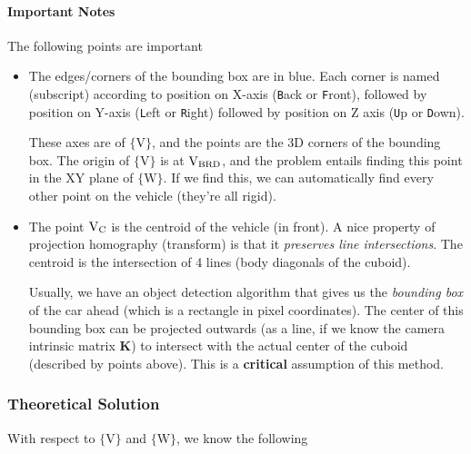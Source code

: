 \paragraph*{Important Notes}

The following points are important

\begin{itemize}
    \item The edges/corners of the bounding box are in blue. Each corner is named (subscript) according to position on X-axis (\texttt{B}ack or \texttt{F}ront), followed by position on Y-axis (\texttt{L}eft or \texttt{R}ight) followed by position on Z axis (\texttt{U}p or \texttt{D}own).

    These axes are of $\{\textrm{V}\}$, and the points are the 3D corners of the bounding box. The origin of $\{\textrm{V}\}$ is at $\textup{V}_{\textup{BRD}}$, and the problem entails finding this point in the XY plane of $\{\textrm{W}\}$. If we find this, we can automatically find every other point on the vehicle (they're all rigid).

    \item The point $\textup{V}_{\textup{C}}$ is the centroid of the vehicle (in front). A nice property of projection homography (transform) is that it \emph{preserves line intersections}. The centroid is the intersection of 4 lines (body diagonals of the cuboid).
    
    Usually, we have an object detection algorithm that gives us the \emph{bounding box} of the car ahead (which is a rectangle in pixel coordinates). The center of this bounding box can be projected outwards (as a line, if we know the camera intrinsic matrix $\mathbf{K}$) to intersect with the actual center of the cuboid (described by points above). This is a \textbf{critical} assumption of this method.
\end{itemize}

\subsubsection{Theoretical Solution}

With respect to $\{\textrm{V}\}$ and $\{\textrm{W}\}$, we know the following

